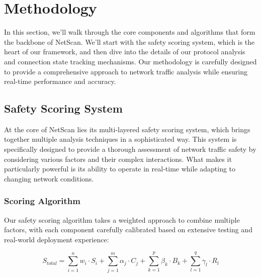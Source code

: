 \documentclass[conference]{IEEEtran}
\newcommand{\netscan}{NetScan}
\begin{document}
\section{Methodology}
\label{sec:methodology}

In this section, we'll walk through the core components and algorithms that form the backbone of \netscan{}. We'll start with the safety scoring system, which is the heart of our framework, and then dive into the details of our protocol analysis and connection state tracking mechanisms. Our methodology is carefully designed to provide a comprehensive approach to network traffic analysis while ensuring real-time performance and accuracy.

\subsection{Safety Scoring System}
At the core of \netscan{} lies its multi-layered safety scoring system, which brings together multiple analysis techniques in a sophisticated way. This system is specifically designed to provide a thorough assessment of network traffic safety by considering various factors and their complex interactions. What makes it particularly powerful is its ability to operate in real-time while adapting to changing network conditions.

\subsubsection{Scoring Algorithm}
Our safety scoring algorithm takes a weighted approach to combine multiple factors, with each component carefully calibrated based on extensive testing and real-world deployment experience:

\begin{equation}
S_{total} = \sum_{i=1}^{n} w_i \cdot S_i + \sum_{j=1}^{m} \alpha_j \cdot C_j + \sum_{k=1}^{p} \beta_k \cdot B_k + \sum_{l=1}^{q} \gamma_l \cdot R_l
\end{equation}
\end{document}

